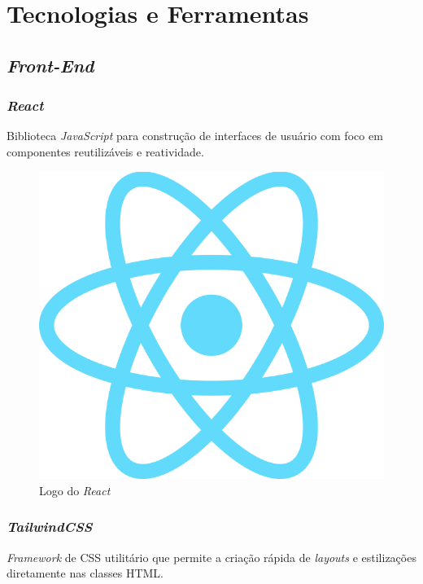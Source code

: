 \section{Tecnologias e Ferramentas} 

\subsection{\emph{Front-End}} 

\subsubsection{\emph{React}} 
Biblioteca \emph{JavaScript} para construção de interfaces de usuário com foco em componentes reutilizáveis e reatividade.

\begin{figure}[htb]
  \centering
  \includegraphics[width=\textwidth]{cap04-desenvolvimento/images/4-4-1-1-react}
  \caption{Logo do \emph{React}}
  \label{fig:diagrama-implantacao}
\end{figure}

\subsubsection{\emph{TailwindCSS}} 
\emph{Framework} de CSS utilitário que permite a criação rápida de \emph{layouts} e estilizações diretamente nas classes HTML.

